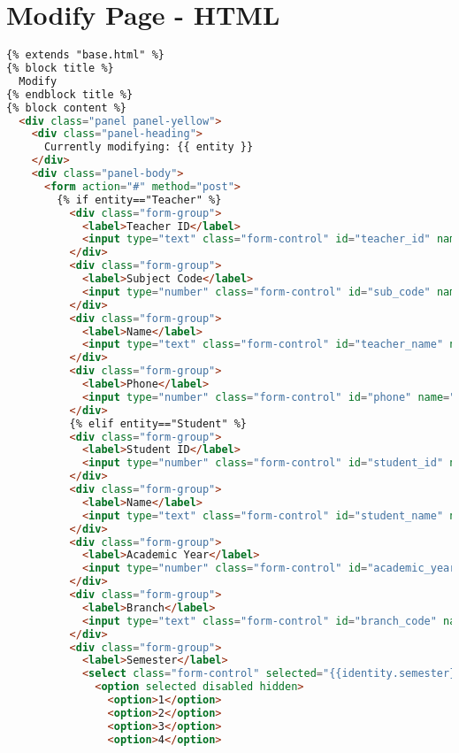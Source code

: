 \section{Modify Page - HTML}
\begin{lstlisting}[language=HTML]
{% extends "base.html" %}
{% block title %}
  Modify
{% endblock title %}
{% block content %}
  <div class="panel panel-yellow">
    <div class="panel-heading">
      Currently modifying: {{ entity }}
    </div>
    <div class="panel-body">
      <form action="#" method="post">
        {% if entity=="Teacher" %}
          <div class="form-group">
            <label>Teacher ID</label>
            <input type="text" class="form-control" id="teacher_id" name="teacher_id" value={{identity.teacher_id}}>
          </div>
          <div class="form-group">
            <label>Subject Code</label>
            <input type="number" class="form-control" id="sub_code" name="sub_code" value={{identity.sub_code}}>
          </div>
          <div class="form-group">
            <label>Name</label>
            <input type="text" class="form-control" id="teacher_name" name="teacher_name" value={{identity.teacher_name}}>
          </div>
          <div class="form-group">
            <label>Phone</label>
            <input type="number" class="form-control" id="phone" name="phone" value={{identity.phone}}>
          </div>
          {% elif entity=="Student" %}
          <div class="form-group">
            <label>Student ID</label>
            <input type="number" class="form-control" id="student_id" name="student_id" value={{identity.student_id}}>
          </div>
          <div class="form-group">
            <label>Name</label>
            <input type="text" class="form-control" id="student_name" name="student_name" value={{identity.student_name}}>
          </div>
          <div class="form-group">
            <label>Academic Year</label>
            <input type="number" class="form-control" id="academic_year" name="academic_year" value={{identity.academic_year}}>
          </div>
          <div class="form-group">
            <label>Branch</label>
            <input type="text" class="form-control" id="branch_code" name="branch_code" value={{identity.branch_code}}>
          </div>
          <div class="form-group">
            <label>Semester</label>
            <select class="form-control" selected="{{identity.semester}}">
              <option selected disabled hidden>
                <option>1</option>
                <option>2</option>
                <option>3</option>
                <option>4</option>

\end{lstlisting}
